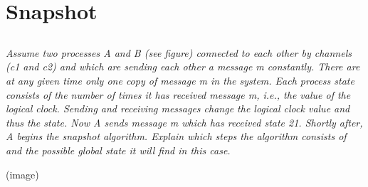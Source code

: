 \documentclass{article}
\newcommand{\question}[1]{\subsection{}\textit{#1}\bigskip}
\begin{document}


\section{Snapshot}

\question{Assume two processes A and B (see figure) connected to each other by channels (c1 and c2) and which are sending each other a message m constantly. There are at any given time only one copy of message m in the system. Each process state consists of the number of times it has received message m, i.e., the value of the logical clock. Sending and receiving messages change the logical clock value and thus the state. Now A sends message m which has received state 21. Shortly after, A begins the snapshot algorithm. Explain which steps the algorithm consists of and the possible global state it will find in this case.}

(image)
\end{document}
